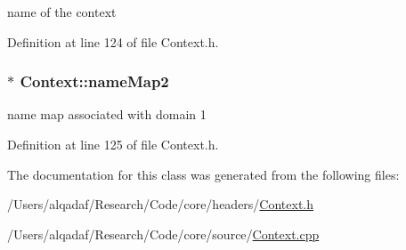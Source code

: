 name of the context 



Definition at line 124 of file Context.h.

\hypertarget{class_context_a24bd477af8de17c09869713cfa06265a}{
\subsubsection[{nameMap2}]{$\ast$ {\bf Context::nameMap2}}}
\label{class_context_a24bd477af8de17c09869713cfa06265a}


name map associated with domain 1 



Definition at line 125 of file Context.h.



The documentation for this class was generated from the following files:\begin{DoxyCompactItemize}
\item 
/Users/alqadaf/Research/Code/core/headers/\hyperlink{_context_8h}{Context.h}\item 
/Users/alqadaf/Research/Code/core/source/\hyperlink{_context_8cpp}{Context.cpp}\end{DoxyCompactItemize}

